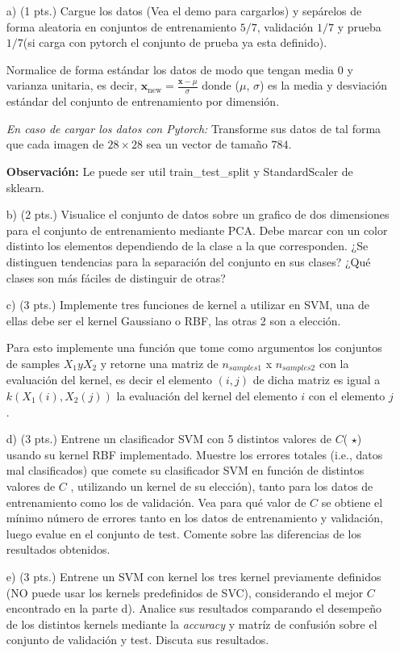 \documentclass[11pt,letterpaper]{article}
\newcommand{\x}{\ensuremath{\mathbf{x}}}
\begin{document}
\begin{enumerate}

\item[a)](1 pts.) Cargue los datos (Vea el demo para cargarlos) y sepárelos de forma aleatoria en conjuntos de entrenamiento $5/7$, validación $1/7$ y prueba $1/7$(si carga con pytorch el conjunto de prueba ya esta definido).

Normalice de forma estándar los datos de modo que tengan media $0$ y varianza unitaria, es decir, $\x_{\text{new}} = \frac{\x - \mu}{\sigma}$ donde ($\mu$, $\sigma$) es la media y desviación estándar del conjunto de entrenamiento por dimensión.

\textit{En caso de cargar los datos con Pytorch:} Transforme sus datos de tal forma que cada imagen de $28 \times 28$ sea un vector de tamaño $784$.

\textbf{Observación:} Le puede ser util train\_test\_split y StandardScaler de sklearn.

\item [b) ](2 pts.) Visualice el conjunto de datos sobre un grafico de dos dimensiones para el conjunto de entrenamiento mediante PCA. Debe marcar con un color distinto los elementos dependiendo de la clase a la que corresponden. ¿Se distinguen tendencias para la separación del conjunto en sus clases? ¿Qué clases son más fáciles de distinguir de otras?

\item[c) ](3 pts.) Implemente tres funciones de kernel a utilizar en SVM, una de ellas debe ser el kernel Gaussiano o RBF, las otras 2 son a elección.

Para esto implemente una función que tome como argumentos los conjuntos de samples $X_1 y X_2$ y retorne una matriz de $n_{samples 1}$ x $n_{samples 2}$ con la evaluación del kernel, es decir el elemento $(i, j)$ de dicha matriz es igual a $k(X_1(i), X_2(j))$ la evaluación del kernel del elemento $i$ con el elemento $j$.


\item[d) ](3 pts.) Entrene un clasificador SVM con 5 distintos valores de $C$( $\star$) usando su kernel RBF implementado. Muestre los errores totales (i.e., datos mal clasificados) que comete su clasificador SVM en función de distintos valores de $C$ , utilizando un kernel de su elección), tanto para los datos de entrenamiento como los de validación. Vea para qué valor de $C$ se obtiene el mínimo número de errores tanto en los datos de entrenamiento y validación, luego evalue en el conjunto de test. Comente sobre las diferencias de los resultados obtenidos.

\item[e) ](3 pts.) Entrene un SVM con kernel los tres kernel previamente definidos (NO puede usar los kernels predefinidos de SVC), considerando el mejor $C$ encontrado en la parte d). Analice sus resultados comparando el desempeño de los distintos kernels mediante la \textit{accuracy} y matríz de confusión sobre el conjunto de validación y test. Discuta sus resultados.

\end{enumerate}
\end{document}
